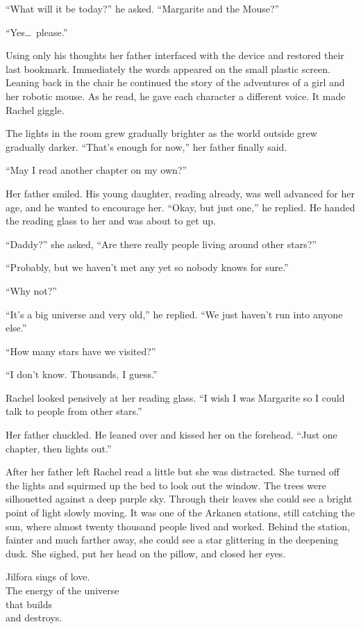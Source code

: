 ``What will it be today?'' he asked. ``Margarite and the Mouse?''

``Yes\ldots\ please.''

Using only his thoughts her father interfaced with the device and restored their last bookmark.
Immediately the words appeared on the small plastic screen. Leaning back in the chair he
continued the story of the adventures of a girl and her robotic mouse. As he read, he gave each
character a different voice. It made Rachel giggle.

The lights in the room grew gradually brighter as the world outside grew gradually darker.
``That's enough for now,'' her father finally said.

``May I read another chapter on my own?''

Her father smiled. His young daughter, reading already, was well advanced for her age, and he
wanted to encourage her. ``Okay, but just one,'' he replied. He handed the reading glass to her
and was about to get up.

``Daddy?'' she asked, ``Are there really people living around other stars?''

``Probably, but we haven't met any yet so nobody knows for sure.''

``Why not?''

``It's a big universe and very old,'' he replied. ``We just haven't run into anyone else.''

``How many stars have we visited?''

``I don't know. Thousands, I guess.''

Rachel looked pensively at her reading glass. ``I wish I was Margarite so I could talk to people
from other stars.''

Her father chuckled. He leaned over and kissed her on the forehead. ``Just one chapter, then
lights out.''

After her father left Rachel read a little but she was distracted. She turned off the lights and
squirmed up the bed to look out the window. The trees were silhouetted against a deep purple
sky. Through their leaves she could see a bright point of light slowly moving. It was one of the
Arkanen stations, still catching the sun, where almost twenty thousand people lived and worked.
Behind the station, fainter and much farther away, she could see a star glittering in the
deepening dusk. She sighed, put her head on the pillow, and closed her eyes.

\spacebreak

\begin{singlespace}
\noindent Jilfora sings of love. \\
The energy of the universe \\
that builds \\
and destroys.
\end{singlespace}
\vspace{1.0em}

